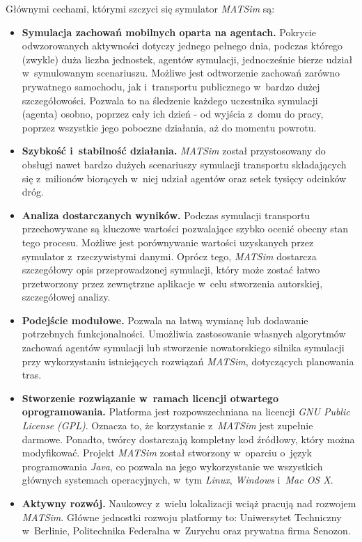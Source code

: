 \documentclass[twoside,12pt]{report}
\begin{document}
Głównymi cechami, którymi szczyci się symulator \textit{MATSim} są:
\begin{itemize}
\item \textbf{Symulacja zachowań mobilnych oparta na agentach.} Pokrycie odwzorowanych aktywności dotyczy jednego pełnego dnia, podczas którego (zwykle) duża liczba jednostek, agentów symulacji, jednocześnie bierze udział w~symulowanym scenariuszu. Możliwe jest odtworzenie zachowań zarówno prywatnego samochodu, jak i~transportu publicznego w~bardzo dużej szczegółowości. Pozwala to na śledzenie każdego uczestnika symulacji (agenta) osobno, poprzez cały ich dzień - od wyjścia z~domu do pracy, poprzez wszystkie jego poboczne działania, aż do momentu powrotu.

\item \textbf{Szybkość i~stabilność działania.} \textit{MATSim} został przystosowany do obsługi nawet bardzo dużych scenariuszy symulacji transportu składających się z~milionów biorących w~niej udział agentów oraz setek tysięcy odcinków dróg.

\item \textbf{Analiza dostarczanych wyników.} Podczas symulacji transportu przechowywane są kluczowe wartości pozwalające szybko ocenić obecny stan tego procesu. Możliwe jest porównywanie wartości uzyskanych przez symulator z~rzeczywistymi danymi. Oprócz tego, \textit{MATSim} dostarcza szczegółowy opis przeprowadzonej symulacji, który może zostać łatwo przetworzony przez zewnętrzne aplikacje w~celu stworzenia autorskiej, szczegółowej analizy.

\item \textbf{Podejście modułowe.} Pozwala na łatwą wymianę lub dodawanie potrzebnych funkcjonalności. Umożliwia zastosowanie własnych algorytmów zachowań agentów symulacji lub stworzenie nowatorskiego silnika symulacji przy wykorzystaniu istniejących rozwiązań \textit{MATSim}, dotyczących planowania tras.

\item \textbf{Stworzenie rozwiązanie w~ramach licencji otwartego oprogramowania.} Platforma jest rozpowszechniana na licencji \textit{GNU Public License (GPL)}. Oznacza to, że korzystanie z~\textit{MATSim} jest zupełnie darmowe. Ponadto, twórcy dostarczają kompletny kod źródłowy, który można modyfikować. Projekt \textit{MATSim} został stworzony w~oparciu o~język programowania \textit{Java}, co pozwala na jego wykorzystanie we wszystkich głównych systemach operacyjnych, w~tym \textit{Linux}, \textit{Windows} i~\textit{Mac OS X}.

\item \textbf{Aktywny rozwój.} Naukowcy z~wielu lokalizacji wciąż pracują nad rozwojem \textit{MATSim}. Główne jednostki rozwoju platformy to: Uniwersytet Techniczny w~Berlinie, Politechnika Federalna w~Zurychu oraz prywatna firma Senozon. 
\end{itemize}
\end{document}
